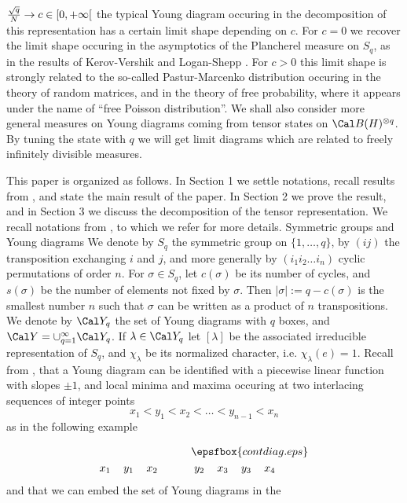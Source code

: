  ${ \sqrt q\over N}\to c\in [0,+\infty[$
  the typical Young diagram occuring in the
 decomposition of this representation has a certain limit shape depending on
 $c$. For $c=0$ we recover the limit shape occuring in the asymptotics
 of the Plancherel measure on $S_q$,
  as in the results of Kerov-Vershik \cite{KV} and
 Logan-Shepp 
 \cite{LS}.  For $c>0$ this limit shape 
 is strongly related to the
 so-called Pastur-Marcenko distribution occuring in the theory of random
 matrices, and in the theory of free probability, where it appears under the
 name of ``free Poisson distribution''. We shall also consider more general
 measures on Young diagrams coming from tensor states on 
 $\Cal B(H)^{\otimes q}$. By tuning the state with $q$
  we will get limit diagrams which are related to  freely infinitely
  divisible
  measures.\par
  This paper is organized as follows. In
 Section 1 we settle notations, recall results from \cite{B},
  and state the main result of the paper. In
 Section 2 we prove the result, and in 
 Section 3 we discuss the decomposition of
 the tensor representation.
 \endhead 
 We recall notations from \cite{B}, to which we refer for more details.
  Symmetric groups
and  Young diagrams\endsubhead
 We denote by $S_q$
 the symmetric group on $\{1,\ldots,q\}$,  
  by $(ij)$ the transposition exchanging $i$ and $j$, and more
generally by $(i_1i_2\ldots i_n)$  cyclic permutations of order $n$. 
For $\sigma\in
S_q$, let $c(\sigma)$ be its number of 
 cycles, and $s(\sigma)$ be the number of elements not fixed by $\sigma$. Then
$\vert\sigma\vert:=q-c(\sigma)$ is the smallest number $n$ such that
$\sigma$ can be written as a product of $n$ transpositions. 
 We denote by $\Cal Y_q$ the set of Young diagrams with $q$ boxes, and
$\Cal Y=\cup_{q=1}^{\infty}\Cal Y_q$.
  If $\lambda\in \Cal Y_q$ let
$[\lambda]$ be the associated 
irreducible representation of $S_q$, and $\chi_{\lambda}$ be its normalized
character, i.e. $\chi_{\lambda}(e)=1$.  
Recall from \cite{B}, \cite{K} that a Young diagram can be identified with
 a piecewise linear function with slopes $\pm 1$,  and  local
minima
and maxima occuring at two interlacing sequences of integer points
$$x_1<y_1<x_2<\ldots<y_{n-1}<x_n$$
as in the following example

$$\aligned{\epsfbox{contdiag.eps}}\\ x_1\quad\,  y_1\quad\, 
x_2\qquad\quad\,\,  y_2\quad\, x_3\quad\, y_3\quad\, x_4\qquad\quad\endaligned$$
and that we can
 embed the set of Young diagrams in the   

